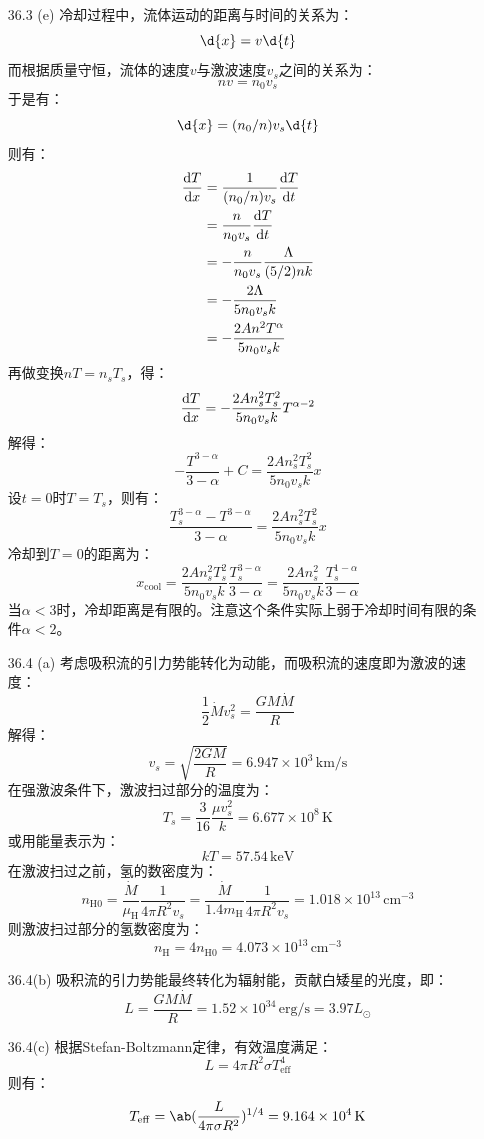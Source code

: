 \documentclass[a4paper,fontset=none]{ctexart}
\begin{document}
\begin{enumerate}
    \medskip
    \item[36.3 (e)]
    冷却过程中，流体运动的距离与时间的关系为：
    \[
        \d{x} = v\d{t}
    \]
    而根据质量守恒，流体的速度$v$与激波速度$v_s$之间的关系为：
    \[
        nv = n_0 v_s
    \]
    于是有：
    \[
        \d{x} = (n_0/n) v_s \d{t}
    \]
    则有：
    \begin{align*}
        \odv{T}{x}
        &= \frac{1}{(n_0/n) v_s} \odv{T}{t} \\
        &= \frac{n}{n_0 v_s} \odv{T}{t} \\
        &= -\frac{n}{n_0 v_s} \frac{\Lambda}{(5/2)nk} \\
        &= -\frac{2\Lambda}{5n_0 v_s k} \\
        &= -\frac{2A n^2 T^\alpha}{5n_0 v_s k}
    \end{align*}
    再做变换$nT = n_s T_s$，得：
    \[
        \odv{T}{x} = -\frac{2A n_s^2 T_s^2}{5n_0 v_s k} T^{\alpha-2}
    \]
    解得：
    \[
        -\frac{T^{3-\alpha}}{3-\alpha} + C = \frac{2A n_s^2 T_s^2}{5n_0 v_s k} x
    \]
    设$t = 0$时$T = T_s$，则有：
    \[
        \frac{T_s^{3-\alpha} - T^{3-\alpha}}{3-\alpha} = \frac{2A n_s^2 T_s^2}{5n_0 v_s k} x
    \]
    冷却到$T = 0$的距离为：
    \[
        x_{\mathrm{cool}} = \frac{2A n_s^2 T_s^2}{5n_0 v_s k} \frac{T_s^{3-\alpha}}{3-\alpha} = \frac{2A n_s^2}{5n_0 v_s k} \frac{T_s^{1-\alpha}}{3-\alpha}
    \]
    当$\alpha < 3$时，冷却距离是有限的。注意这个条件实际上弱于冷却时间有限的条件$\alpha < 2$。

    \bigskip
    \item[36.4 (a)]
    考虑吸积流的引力势能转化为动能，而吸积流的速度即为激波的速度：
    \[
        \frac{1}{2}\dot{M}v_s^2 = \frac{GM\dot{M}}{R}
    \]
    解得：
    \[
        v_s = \sqrt{\frac{2GM}{R}} = 6.947 \times 10^3\,\mathrm{km/s}
    \]
    在强激波条件下，激波扫过部分的温度为：
    \[
        T_s = \frac{3}{16} \frac{\mu v_s^2}{k} = 6.677 \times 10^8\,\mathrm{K}
    \]
    或用能量表示为：
    \[
        kT = 57.54\,\mathrm{keV}
    \]
    在激波扫过之前，氢的数密度为：
    \[
        n_{\mathrm{H0}} = \frac{\dot{M}}{\mu_{\mathrm{H}}} \frac{1}{4\pi R^2 v_s} = \frac{\dot{M}}{1.4m_{\mathrm{H}}} \frac{1}{4\pi R^2 v_s} = 1.018 \times 10^13\,\mathrm{cm^{-3}}
    \]
    则激波扫过部分的氢数密度为：
    \[
        n_{\mathrm{H}} = 4n_{\mathrm{H0}} = 4.073 \times 10^{13}\,\mathrm{cm^{-3}}
    \]

    \medskip
    \item[36.4(b)]
    吸积流的引力势能最终转化为辐射能，贡献白矮星的光度，即：
    \[
        L = \frac{GM\dot{M}}{R} = 1.52 \times 10^{34}\,\mathrm{erg/s} = 3.97 L_\odot
    \]

    \medskip
    \item[36.4(c)]
    根据Stefan-Boltzmann定律，有效温度满足：
    \[
        L = 4\pi R^2 \sigma T_{\mathrm{eff}}^4
    \]
    则有：
    \[
        T_{\mathrm{eff}} = \ab(\frac{L}{4\pi\sigma R^2})^{1/4} = 9.164 \times 10^4\,\mathrm{K}
    \]

\end{enumerate}
\end{document}
